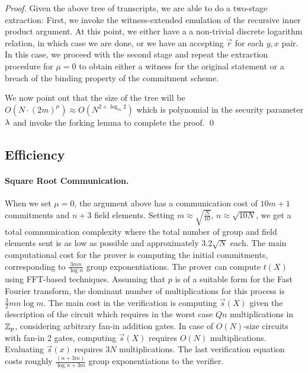 \begin{proof}
Given the above tree of transcripts, we are able to do a two-stage extraction: First, we invoke the witness-extended emulation of the recursive inner product argument. %
At this point, we either have a a non-trivial discrete logarithm relation, in which case we are done, or we have an accepting $\vec{r}$ for each $y,x$ pair. In this case, we proceed with the second stage and repeat the extraction procedure for $\mu =0$ to obtain either a witness for the original statement or a breach of the binding property of the commitment scheme.

We now point out that the size of the tree will be $O(N\cdot(2m)^{\mu})\approx O (N^{2+\log_m 2})$ which is polynomial in the security parameter $\lambda$ and invoke the forking lemma to complete the proof. \qed
\end{proof}

\subsection{Efficiency} \paragraph{Square Root Communication.} When we set $\mu=0$, the argument above has a communication cost of $10m+1$ commitments and $n+3$ field elements. Setting $m \approx \sqrt{\frac{N}{10}}$, $n\approx \sqrt{10N}$, we get a total communication complexity where the total number of group and field elements sent is as low as possible and approximately $3.2\sqrt{N}$ each.
%
The main computational cost for the prover is computing the initial commitments, corresponding to $\frac{3mn}{\log{n}}$ group exponentiations. The prover can compute $t(X)$ using FFT-based techniques. Assuming that $p$ is of a suitable form for the Fast Fourier transform, the dominant number of multiplications for this process is $\frac{3}{2} mn\log{m}$.
The main cost in the verification is computing $\vec{s}(X)$ given the description of the circuit which requires in the worst case $Qn$ multiplications in $\mathbb{Z}_p$, considering arbitrary fan-in addition gates. In case of $O(N)$-size circuits with fan-in 2 gates, computing  $\vec{s}(X)$ requires $O(N)$ multiplications. Evaluating $\vec{s}(x)$ requires $3N$ multiplications. The last verification equation costs roughly
 $\frac{(n+3m)}{\log{n+3m}}$ group exponentiations to the verifier.

